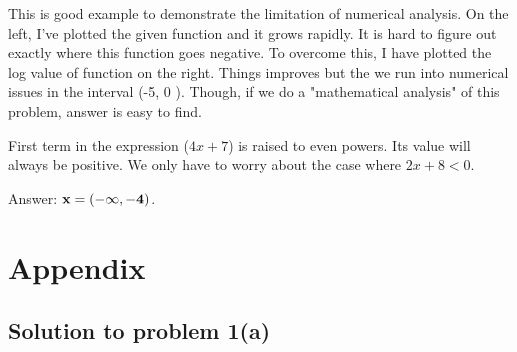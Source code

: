 \documentclass[12pt,answers,addpoints]{exam}
\begin{document}
\begin{questions}
\begin{parts}
\begin{solution}
    This is good example to demonstrate the limitation of numerical analysis. On
    the left, I've plotted the given function and it grows rapidly. It is hard to
    figure out exactly where this function goes negative. To overcome this, I
    have plotted the log value of function on the right. Things improves but the
    we run into numerical issues in the interval (-5, 0 ). Though, if we do a
    "mathematical analysis" of this problem, answer is easy to find.

    

    First term in the expression ($4x+7$) is raised to even powers.
    Its value will always be positive. We only have to worry about the case where
    $2x+8<0$.  
    
    Answer: $\bf x = (-\infty, -4)$.  


\end{solution}

\end{parts}

\end{questions}

\section{Appendix}
\subsection{Solution to problem 1(a)}
\scriptsize
\inputminted{python}{./sol1_a.py}
\end{document}
